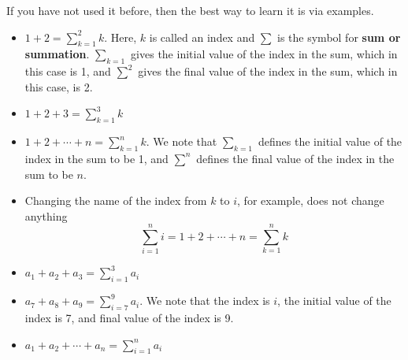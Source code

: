 \begin{tcolorbox}[title=\textbf{The summation symbol}]

If you have not used it before, then the best way to learn it is via examples.
\begin{itemize}
    \item $1 + 2= \sum_{k=1}^{2} k $.  Here, $k$ is called an index and $\sum$ is the symbol for \textbf{sum or summation}. $\sum_{k=1}$ gives the initial value of the index in the sum, which in this case is 1, and  $\sum^2$ gives the final value of the index in the sum, which in this case, is 2.
    \item $1 + 2 + 3= \sum_{k=1}^{3} k $
    \item $1 + 2 + \cdots + n = \sum_{k=1}^{n} k $. We note that $\sum_{k=1}$ defines the initial value of the index in the sum to be 1, and  $\sum^n$ defines the final value of the index in the sum to be $n$.
    \item Changing the name of the index from $k$ to $i$, for example, does not change anything
    $$ \sum_{i=1}^{n} i =  1 + 2 + \cdots + n = \sum_{k=1}^{n} k $$
    \item $a_1+a_2 +a_3 =  \sum_{i=1}^{3} a_i$
    \item $a_7+a_8 +a_9 =  \sum_{i=7}^{9} a_i$. We note that the index is $i$, the initial value of the index is 7, and final value of the index is 9.
        \item $a_1+a_2 + \cdots + a_n =  \sum_{i=1}^{n} a_i$
    
\end{itemize}

\end{tcolorbox} 


